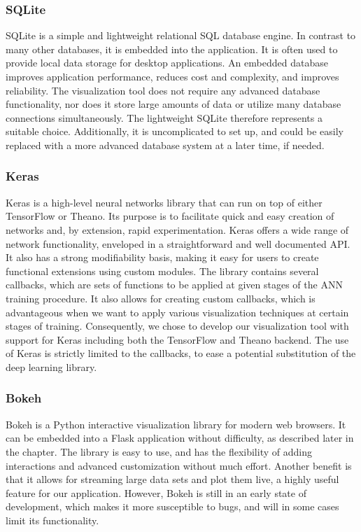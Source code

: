 \subsubsection{SQLite}

SQLite is a simple and lightweight relational SQL database engine. In contrast to many other databases, it is embedded into the application. It is often used to provide local data storage for desktop applications. An embedded database improves application performance, reduces cost and complexity, and improves reliability. The visualization tool does not require any advanced database functionality, nor does it store large amounts of data or utilize many database connections simultaneously. The lightweight SQLite therefore represents a suitable choice. Additionally, it is uncomplicated to set up, and could be easily replaced with a more advanced database system at a later time, if needed.

\subsubsection{Keras}

Keras is a high-level neural networks library that can run on top of either TensorFlow or Theano. Its purpose is to facilitate quick and easy creation of networks and, by extension, rapid experimentation. Keras offers a wide range of network functionality, enveloped in a straightforward and well documented API. It also has a strong modifiability basis, making it easy for users to create functional extensions using custom modules. The library contains several callbacks, which are sets of functions to be applied at given stages of the ANN training procedure. It also allows for creating custom callbacks, which is advantageous when we want to apply various visualization techniques at certain stages of training. Consequently, we chose to develop our visualization tool with support for Keras including both the TensorFlow and Theano backend. The use of Keras is strictly limited to the callbacks, to ease a potential substitution of the deep learning library.

\subsubsection{Bokeh}

Bokeh is a Python interactive visualization library for modern web browsers. It can be embedded into a Flask application without difficulty, as described later in the chapter. The library is easy to use, and has the flexibility of adding interactions and advanced customization without much effort. Another benefit is that it allows for streaming large data sets and plot them live, a highly useful feature for our application. However, Bokeh is still in an early state of development, which makes it more susceptible to bugs, and will in some cases limit its functionality.

